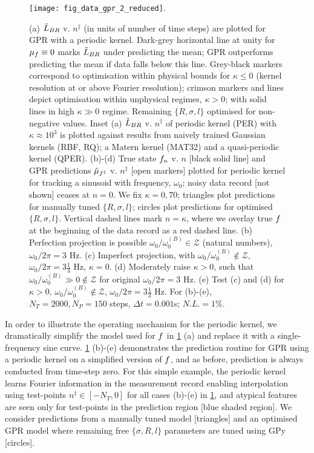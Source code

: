 \begin{figure}
	\texttt{[image: fig\_data\_gpr\_2\_reduced]}. 
	\caption{\label{fig:main:fig_data_gpr} (a) $\tilde{L}_{BR}$ v. $n^\ddagger$ (in units of number of time steps) are plotted for GPR with a periodic kernel. Dark-grey horizontal line at unity for $\mu_f \equiv 0$ marks $\tilde{L}_{BR}$ under predicting the mean; GPR outperforms predicting the mean if data falls below this line. Grey-black markers correspond to optimisation within physical bounds for $\kappa \leq 0 $ (kernel resolution at or above Fourier resolution); crimson markers and lines depict optimisation within unphysical regimes, $\kappa >0$; with solid lines in high $\kappa \gg 0$ regime. Remaining  $\{R, \sigma, l\}$ optimised for non-negative values. Inset (a) $\tilde{L}_{BR}$ v. $n^\ddagger$ of periodic kernel (PER) with $\kappa \approx 10^3$ is plotted against results from naively trained Gaussian kernels (RBF, RQ); a Matern kernel (MAT32) and a quasi-periodic kernel (QPER). (b)-(d) True state $f_n$ v. $n$ [black solid line] and GPR predictions $\hat{\mu}_{f^\ddagger}$ v. $n^\ddagger$ [open markers]  plotted for periodic kernel for tracking a sinusoid with frequency, $\omega_0$; noisy data record [not shown] ceases at $n=0$. We fix $\kappa = 0, 70$; triangles plot predictions for manually tuned $\{R, \sigma, l\}$; circles plot predictions for optimised $\{R, \sigma, l\}$. Vertical dashed lines mark $n=\kappa$, where we overlay true $f$ at the beginning of the data record as a red dashed line. (b) Perfection projection is possible $\omega_0 / \omega_0^{(B)} \in \mathcal{Z}$ (natural numbers), $\omega_0/2\pi = 3$ Hz. (c) Imperfect projection, with $\omega_0 / \omega_0^{(B)} \notin \mathcal{Z}$, $\omega_0 / 2 \pi = 3 \frac{1}{3}$ Hz, $\kappa=0$. (d) Moderately raise $\kappa > 0 $, such that $\omega_0 / \omega_0^{(B)} \gg 0 \notin \mathcal{Z}$ for original $ \omega_0 / 2 \pi = 3$ Hz. (e) Test (c) and (d) for $\kappa > 0$, $ \omega_0 / \omega_0^{(B)} \notin \mathcal{Z}$, $\omega_0 / 2 \pi = 3 \frac{1}{3}$ Hz. For (b)-(e), $N_T = 2000, N_P = 150$ steps, $\Delta t = 0.001$s; $N.L.= 1\%$.}    	
\end{figure}

In order to illustrate the operating mechanism for the periodic kernel, we dramatically simplify the model used for $f$  in  \cref{fig:main:fig_data_gpr} (a) and replace it with a single-frequency sine curve.  \cref{fig:main:fig_data_gpr} (b)-(e) demonstrates the prediction routine for GPR using a periodic kernel on a simplified version of $f$, and as before, prediction is always conducted from time-step zero. For this simple example, the periodic kernel learns Fourier information in the measurement record enabling interpolation using test-points $n^{\ddagger} \in [-N_T, 0]$ for all cases (b)-(e) in \cref{fig:main:fig_data_gpr}, and atypical features are seen only for test-points in the prediction region [blue shaded region]. We consider predictions from a manually tuned model [triangles] and an optimised GPR model where remaining free $\{\sigma, R, l \}$ parameters are tuned using GPy [circles]. 

